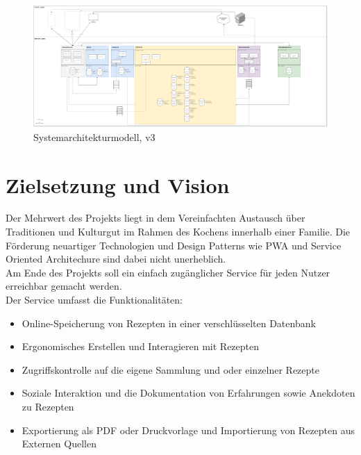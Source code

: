 \documentclass[10pt]{article}
\begin{document}
    \begin{figure}[h] %
        \includegraphics[width=1\textwidth]{../../Systemarchitektur/PPSS21_Mai_Systemarchitektur_v3.png}
        \caption[Die Vision]{Systemarchitekturmodell, v3}
        \label{fig:systemarchitekturmodell}
    \end{figure}
    \section{Zielsetzung und Vision}\label{sec:Zielsetzung}
    Der Mehrwert des Projekts liegt in dem Vereinfachten Austausch über Traditionen und Kulturgut im Rahmen des Kochens innerhalb einer Familie. Die Förderung neuartiger Technologien und Design Patterns wie PWA und Service Oriented Architechure sind dabei nicht unerheblich.\\
    Am Ende des Projekts soll ein einfach zugänglicher Service für jeden Nutzer erreichbar gemacht werden. \\
    Der Service umfasst die Funktionalitäten:
    \begin{itemize}
        \item Online-Speicherung von Rezepten in einer verschlüsselten Datenbank
        \item Ergonomisches Erstellen und Interagieren mit Rezepten
        \item Zugriffskontrolle auf die eigene Sammlung und oder einzelner Rezepte
        \item Soziale Interaktion und die Dokumentation von Erfahrungen sowie Anekdoten zu Rezepten
        \item Exportierung als PDF oder Druckvorlage und Importierung von Rezepten aus Externen Quellen
    \end{itemize} 
\end{document}
